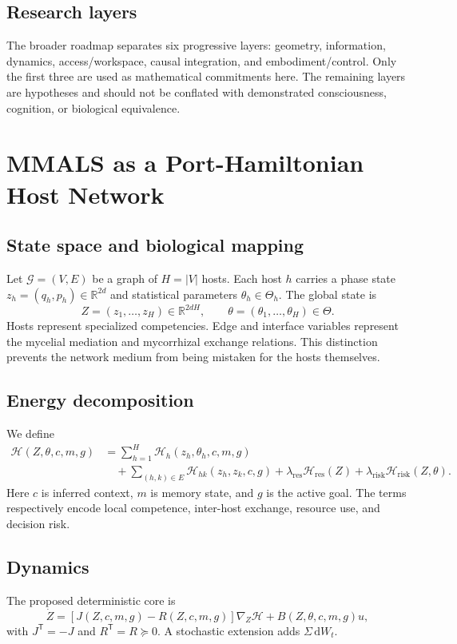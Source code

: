 \documentclass[11pt]{article}
\theoremstyle{definition}\newtheorem{definition}{Definition}\newtheorem{assumption}{Assumption}
\theoremstyle{remark}\newtheorem{remark}{Remark}
\newcommand{\R}{\mathbb{R}}\newcommand{\C}{\mathbb{C}}\newcommand{\E}{\mathbb{E}}
\newcommand{\dd}{\mathrm{d}}\newcommand{\T}{^{\mathsf T}}
\begin{document}
\subsection{Research layers}
The broader roadmap separates six progressive layers: geometry, information, dynamics, access/workspace, causal integration, and embodiment/control. Only the first three are used as mathematical commitments here. The remaining layers are hypotheses and should not be conflated with demonstrated consciousness, cognition, or biological equivalence.

\section{MMALS as a Port-Hamiltonian Host Network}
\subsection{State space and biological mapping}
Let $\mathcal G=(V,E)$ be a graph of $H=|V|$ hosts. Each host $h$ carries a phase state $z_h=(q_h,p_h)\in\R^{2d}$ and statistical parameters $\theta_h\in\Theta_h$. The global state is
\begin{equation}
Z=(z_1,\ldots,z_H)\in\R^{2dH},\qquad \theta=(\theta_1,\ldots,\theta_H)\in\Theta.
\end{equation}
Hosts represent specialized competencies. Edge and interface variables represent the mycelial mediation and mycorrhizal exchange relations. This distinction prevents the network medium from being mistaken for the hosts themselves.

\subsection{Energy decomposition}
We define
\begin{align}
\mathcal H(Z,\theta,c,m,g)
&=\sum_{h=1}^H \mathcal H_h(z_h,\theta_h,c,m,g) \\
&\quad +\sum_{(h,k)\in E}\mathcal H_{hk}(z_h,z_k,c,g)
+\lambda_{\mathrm{res}}\mathcal H_{\mathrm{res}}(Z)
+\lambda_{\mathrm{risk}}\mathcal H_{\mathrm{risk}}(Z,\theta).
\label{eq:mmals_energy}
\end{align}
Here $c$ is inferred context, $m$ is memory state, and $g$ is the active goal. The terms respectively encode local competence, inter-host exchange, resource use, and decision risk.

\subsection{Dynamics}
The proposed deterministic core is
\begin{equation}
\dot Z=[J(Z,c,m,g)-R(Z,c,m,g)]\nabla_Z\mathcal H+B(Z,\theta,c,m,g)u,
\label{eq:ph}
\end{equation}
with $J\T=-J$ and $R\T=R\succeq 0$. A stochastic extension adds $\Sigma\,\dd W_t$.
\end{document}
